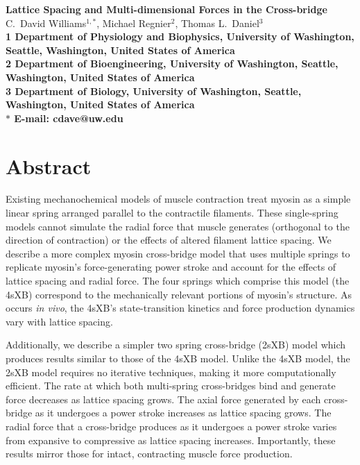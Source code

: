 \documentclass[10pt]{article}
\date{} %
\begin{document}
\begin{flushleft}
{\Large
\textbf{Lattice Spacing and Multi-dimensional Forces in the Cross-bridge}
}
\\
C.\ David Williams$^{1,\ast}$, 
Michael Regnier$^{2}$, 
Thomas L.\ Daniel$^{3}$
\\
\bf{1} Department of Physiology and Biophysics, University of Washington, Seattle, Washington, United States of America
\\
\bf{2} Department of Bioengineering, University of Washington, Seattle, Washington, United States of America
\\
\bf{3} Department of Biology, University of Washington, Seattle, Washington, United States of America
\\
$\ast$ E-mail: cdave@uw.edu
\end{flushleft}

\section*{Abstract} %
Existing mechanochemical models of muscle contraction treat myosin as a simple linear spring arranged parallel to the contractile filaments.
These single-spring models cannot simulate the radial force that muscle generates (orthogonal to the direction of contraction) or the effects of altered filament lattice spacing. 
We describe a more complex myosin cross-bridge model that uses multiple springs to replicate myosin's force-generating power stroke and account for the effects of lattice spacing and radial force. 
The four springs which comprise this model (the 4sXB) correspond to the mechanically relevant portions of myosin's structure.
As occurs \emph{in vivo}, the 4sXB's state-transition kinetics and force production dynamics vary with lattice spacing.

Additionally, we describe a simpler two spring cross-bridge (2sXB) model which produces results similar to those of the 4sXB model.
Unlike the 4sXB model, the 2sXB model requires no iterative techniques, making it more computationally efficient.
The rate at which both multi-spring cross-bridges bind and generate force decreases as lattice spacing grows. 
The axial force generated by each cross-bridge as it undergoes a power stroke increases as lattice spacing grows.
The radial force that a cross-bridge produces as it undergoes a power stroke varies from expansive to compressive as lattice spacing increases.
Importantly, these results mirror those for intact, contracting muscle force production.
\end{document}

